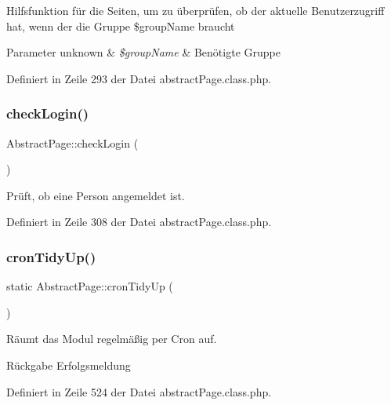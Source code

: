 Hilfsfunktion für die Seiten, um zu überprüfen, ob der aktuelle Benutzerzugriff hat, wenn der die Gruppe \$group\+Name braucht 
\begin{DoxyParams}[1]{Parameter}
unknown & {\em \$group\+Name} & Benötigte Gruppe \\
\hline
\end{DoxyParams}


Definiert in Zeile 293 der Datei abstract\+Page.\+class.\+php.

\mbox{\label{class_abstract_page_a96a43489593d68c881e90978b447e234}} 
\subsubsection{\texorpdfstring{check\+Login()}{checkLogin()}}
{\footnotesize\ttfamily Abstract\+Page\+::check\+Login (\begin{DoxyParamCaption}{ }\end{DoxyParamCaption})\hspace{0.3cm}{\ttfamily [protected]}}

Prüft, ob eine Person angemeldet ist. 

Definiert in Zeile 308 der Datei abstract\+Page.\+class.\+php.

\mbox{\label{class_abstract_page_a6d3e469dc3dcc986d3ebfc6cc7eb6197}} 
\subsubsection{\texorpdfstring{cron\+Tidy\+Up()}{cronTidyUp()}}
{\footnotesize\ttfamily static Abstract\+Page\+::cron\+Tidy\+Up (\begin{DoxyParamCaption}{ }\end{DoxyParamCaption})\hspace{0.3cm}{\ttfamily [static]}}

Räumt das Modul regelmäßig per Cron auf. \begin{DoxyReturn}{Rückgabe}
Erfolgsmeldung 
\end{DoxyReturn}


Definiert in Zeile 524 der Datei abstract\+Page.\+class.\+php.

